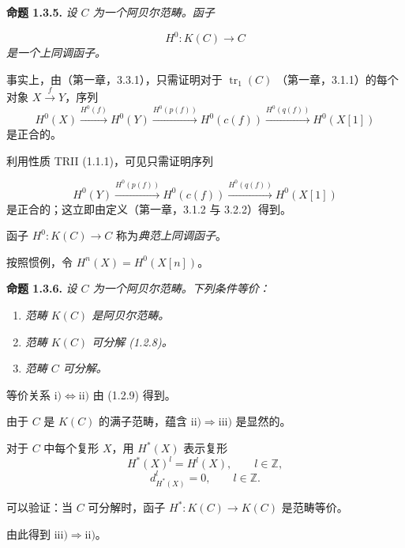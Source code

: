 
\clearpage
{}%
\begingroup
\small
\setlength{\emergencystretch}{1.5em}%
\setlength{\abovedisplayskip}{4pt plus 2pt minus 2pt}%
\setlength{\belowdisplayskip}{4pt plus 2pt minus 2pt}%

\noindent\textbf{命题 1.3.5.}\quad
\emph{设 $C$ 为一个阿贝尔范畴。函子}

\[
  H^0\colon K(C)\longrightarrow C
\]
\noindent\emph{是一个上同调函子。}

事实上，由（第一章，3.3.1），只需证明对于 $\operatorname{tr}_1(C)$
（第一章，3.1.1）的每个对象 $X\xrightarrow{f}Y$，序列
\[
  H^0(X)\xrightarrow{H^0(f)}H^0(Y)
  \xrightarrow{H^0(p(f))}H^0(c(f))
  \xrightarrow{H^0(q(f))}H^0(X[1])
\]
\noindent 是正合的。

利用性质 TRII (1.1.1)，可见只需证明序列

\[
  H^0(Y)\xrightarrow{H^0(p(f))}H^0(c(f))
  \xrightarrow{H^0(q(f))}H^0(X[1])
\]
\noindent 是正合的；这立即由定义（第一章，3.1.2 与 3.2.2）得到。

函子 $H^0\colon K(C)\longrightarrow C$ 称为\emph{典范上同调函子}。

按照惯例，令 $H^n(X)=H^0(X[n])$。

\medskip
\noindent\textbf{命题 1.3.6.}\quad
\emph{设 $C$ 为一个阿贝尔范畴。下列条件等价：}

\begin{enumerate}
\renewcommand{\labelenumi}{\roman{enumi})}
\item \emph{范畴 $K(C)$ 是阿贝尔范畴。}
\item \emph{范畴 $K(C)$ 可分解 (1.2.8)。}
\item \emph{范畴 $C$ 可分解。}
\end{enumerate}

等价关系 $\mathrm{i)}\Longleftrightarrow\mathrm{ii)}$ 由 (1.2.9) 得到。

由于 $C$ 是 $K(C)$ 的满子范畴，蕴含
$\mathrm{ii)}\Longrightarrow\mathrm{iii)}$ 是显然的。

对于 $C$ 中每个复形 $X$，用 $H^*(X)$ 表示复形
\[
  H^*(X)^l=H^l(X),\qquad l\in\mathbb Z,
\]
\[
  d_{H^*(X)}^l=0,\qquad l\in\mathbb Z.
\]

可以验证：当 $C$ 可分解时，函子
$H^*\colon K(C)\longrightarrow K(C)$ 是范畴等价。

由此得到 $\mathrm{iii)}\Longrightarrow\mathrm{ii)}$。
\endgroup


